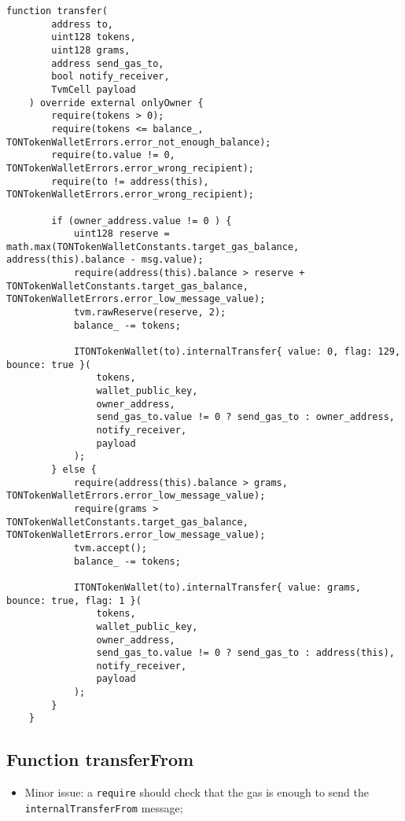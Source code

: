 \begin{lstlisting}[firstnumber=262]
    function transfer(
        address to,
        uint128 tokens,
        uint128 grams,
        address send_gas_to,
        bool notify_receiver,
        TvmCell payload
    ) override external onlyOwner {
        require(tokens > 0);
        require(tokens <= balance_, TONTokenWalletErrors.error_not_enough_balance);
        require(to.value != 0, TONTokenWalletErrors.error_wrong_recipient);
        require(to != address(this), TONTokenWalletErrors.error_wrong_recipient);

        if (owner_address.value != 0 ) {
            uint128 reserve = math.max(TONTokenWalletConstants.target_gas_balance, address(this).balance - msg.value);
            require(address(this).balance > reserve + TONTokenWalletConstants.target_gas_balance, TONTokenWalletErrors.error_low_message_value);
            tvm.rawReserve(reserve, 2);
            balance_ -= tokens;

            ITONTokenWallet(to).internalTransfer{ value: 0, flag: 129, bounce: true }(
                tokens,
                wallet_public_key,
                owner_address,
                send_gas_to.value != 0 ? send_gas_to : owner_address,
                notify_receiver,
                payload
            );
        } else {
            require(address(this).balance > grams, TONTokenWalletErrors.error_low_message_value);
            require(grams > TONTokenWalletConstants.target_gas_balance, TONTokenWalletErrors.error_low_message_value);
            tvm.accept();
            balance_ -= tokens;

            ITONTokenWallet(to).internalTransfer{ value: grams, bounce: true, flag: 1 }(
                tokens,
                wallet_public_key,
                owner_address,
                send_gas_to.value != 0 ? send_gas_to : address(this),
                notify_receiver,
                payload
            );
        }
    }
\end{lstlisting}

\subsection{Function transferFrom}

\begin{itemize}
\item Minor issue: a {\tt require} should check that the gas is enough
  to send the {\tt internalTransferFrom} message;
\end{itemize}

